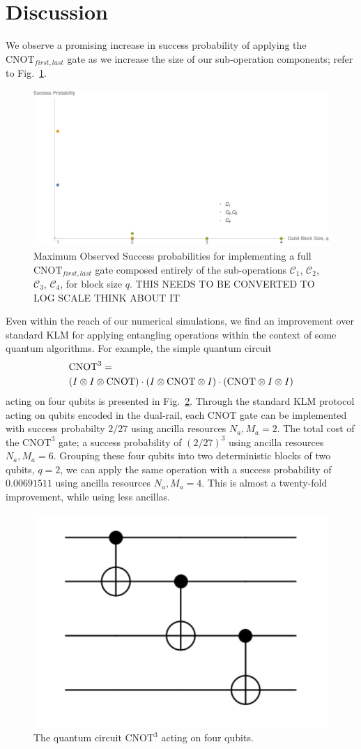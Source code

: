 \documentclass[aps,pra,twocolumn,showpacs,superscriptaddress,floatfix,10pt]{revtex4}
\begin{document}
 \section{Discussion}
 \label{Section Conclusion}
 We observe a promising increase in success probability of applying the $\mbox{CNOT}_{first,last}$ gate as we increase the size of our sub-operation components; refer to Fig.~\ref{Figure - Block Encoding Results}. 
 \begin{figure}[h]
  	\centering
  	\includegraphics[width=0.5 \textwidth]{./blockencodingresults.pdf}
  	\caption{Maximum Observed Success probabilities for implementing a full $\mbox{CNOT}_{first,last}$ gate composed entirely of the sub-operations $\mathcal{C}_1$, $\mathcal{C}_2$, $\mathcal{C}_3$, $\mathcal{C}_4$, for block size $q$. THIS NEEDS TO BE CONVERTED TO LOG SCALE THINK ABOUT IT}
  	\label{Figure - Block Encoding Results}
  \end{figure}
Even within the reach of our numerical simulations, we find an improvement over standard KLM for applying entangling operations within the context of some quantum algorithms. For example, the simple quantum circuit 
 \begin{eqnarray}
 \small & \mbox{CNOT}^3 = \\ \small \nonumber & (I \otimes I \otimes \mbox{CNOT}) \cdot (I \otimes  \mbox{CNOT} \otimes I) \cdot (\mbox{CNOT} \otimes I \otimes I)
 \end{eqnarray}
 acting on four qubits is presented in Fig.~\ref{Three CNOTs}. Through the standard KLM protocol acting on qubits encoded in the dual-rail, each CNOT gate can be implemented with success probabilty $2/27$ using ancilla resources $N_a,M_a=2$. The total cost of the $\mbox{CNOT}^3$ gate; a success probability of $(2/27)^3$ using ancilla resources $ N_a,M_a = 6 $. Grouping these four qubits into two deterministic blocks of two qubits, $q=2$, we can apply the same operation with a success probability of $0.00691511$ using ancilla resources $ N_a,M_a=4 $. This is almost a twenty-fold improvement, while using less ancillas.
 \begin{figure}[ht]
 	\centering
 	\includegraphics[width=0.25 \textwidth]{./ThreeCNOTs.pdf}
 	\caption{The quantum circuit $\mbox{CNOT}^3$ acting on four qubits.}
 	\label{Three CNOTs}
 \end{figure}
\end{document}
